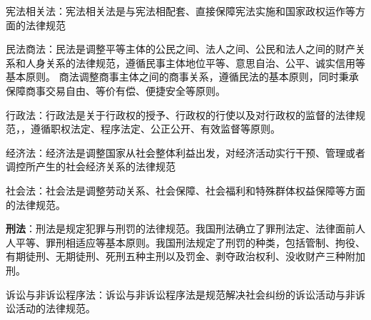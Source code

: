 {宪法相关法}{：宪法相关法是与宪法相配套、直接保障宪法实施和国家政权运作等方面的法律规范}

{民法商法}{：民法是调整平等主体的公民之间、法人之间、公民和法人之间的财产关系和人身关系的法律规范，}{遵循民事主体地位平等、意思自治、公平、诚实信用等基本原则}{。
商法调整商事主体之间的商事关系，}{遵循民法的基本原则，同时秉承保障商事交易自由、等价有偿、便捷安全等原则}{。}

{行政法}{：行政法是关于行政权的授予、行政权的行使以及对行政权的监督的法律规范，，遵循职权法定、程序法定、公正公开、有效监督等原则。}

{经济法}{：经济法是调整国家从社会整体利益出发，对经济活动实行干预、管理或者调控所产生的社会经济关系的法律规范}

{社会法}{：社会法是调整劳动关系、社会保障、社会福利和特殊群体权益保障等方面的法律规范。}

\textbf{{刑法}}{：}{刑法是规定犯罪与刑罚的法律规范}{。我国刑法确立了}{罪刑法定、法律面前人人平等、罪刑相适应等基本原则}{。我国刑法规定了刑罚的种类，包括}{管制、拘役、有期徒刑、无期徒刑、死刑五种主刑以及罚金、剥夺政治权利、没收财产三种附加刑}{。}

{诉讼与非诉讼程序法}{：诉讼与非诉讼程序法是规范解决社会纠纷的诉讼活动与非诉讼活动的法律规范。}
